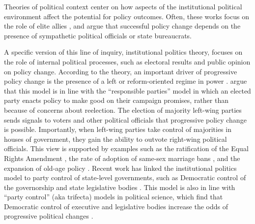 Theories of political context center on how aspects of the institutional political environment affect the potential for policy outcomes. Often, these works focus on the role of elite allies \citep{amenta_et_al_1994,amenta_2006}, and argue that successful policy change depends on the presence of sympathetic political officials or state bureaucrats. 

A specific version of this line of inquiry, institutional politics theory, focuses on the role of internal political processes, such as electoral results and public opinion on policy change. According to the theory, an important driver of progressive policy change is the presence of a left or reform-oriented regime in power \citep{amenta_et_al_2005,korpi_1983}. \citet{amenta_and_elliott_2019} argue that this model is in line with the ``responsible parties'' model \citep{schattschneider_1942} in which an elected party enacts policy to make good on their campaign promises, rather than because of concerns about reelection. The election of majority left-wing parties sends signals to voters and other political officials that progressive policy change is possible. Importantly, when left-wing parties take control of majorities in houses of government, they gain the ability to outvote right-wing political officials. This view is supported by examples such as the ratification of the Equal Rights Amendment \citep{soule_and_olzak_2004,soule_and_king_2006}, the rate of adoption of same-sex marriage bans \citep{soule_2004,mcveigh_and_diaz_2009}, and the expansion of old-age policy \citep{amenta_and_elliott_2019,amenta_et_al_2005}. Recent work has linked the institutional politics model to party control of state-level governments, such as Democratic control of the governorship and state legislative bodies \citep{amenta_and_elliott_2019}. This model is also in line with ``party control'' (aka trifecta) models in political science, which find that Democratic control of executive and legislative bodies increase the odds of progressive political changes \citep{ansolabehere_and_snyder2006,winters_1976,abramowitz_1983,campagna_and_grofman_1990}. 








